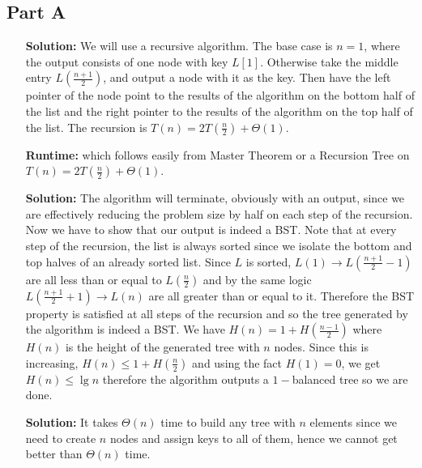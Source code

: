 \documentclass[12pt,twoside]{article}
\begin{document}
\begin{problems}
\section*{Part A}
\problem
\begin{problemparts}
\problempart
\setdefaultleftmargin{8cm}{2cm}{}{}{}{}
\begin{itemize}
\item [\textbf{Solution:} ]We will use a recursive algorithm. The base case is $n=1$, where the output consists of one node with key $L[1]$. Otherwise take the middle entry $L(\frac{n+1}{2})$, and output a node with it as the key. Then have the left pointer of the node point to the results of the algorithm on the bottom half of the list and the right pointer to the results of the algorithm on the top half of the list. The recursion is $T(n)=2T(\frac{n}{2})+\Theta(1)$.
\item [\textbf{Runtime:} ]  which follows easily from Master Theorem or a Recursion Tree on $T(n)=2T(\frac{n}{2})+\Theta(1)$.
\end{itemize}
\problempart 
\begin{itemize}
\item [\textbf{Solution:}] The algorithm will terminate, obviously with an output, since we are effectively reducing the problem size by half on each step of the recursion. Now we have to show that our output is indeed a BST. Note that at every step of the recursion, the list is always sorted since we isolate the bottom and top halves of an already sorted list. Since $L$ is sorted, $L(1) \rightarrow L(\frac{n+1}{2}-1)$ are all less than or equal to $L(\frac{n}{2})$ and by the same logic $L(\frac{n+1}{2}+1)\rightarrow L(n)$ are all greater than or equal to it. Therefore the BST property is satisfied at all steps of the recursion and so the tree generated by the algorithm is indeed a BST. We have $H(n)=1+H(\frac{n-1}{2})$ where $H(n)$ is the height of the generated tree with $n$ nodes. Since this is increasing, $H(n)\leq 1 + H(\frac{n}{2})$ and using the fact $H(1)=0$, we get $H(n) \leq \lg n$ therefore the algorithm outputs a $1-$balanced tree so we are done.
\end{itemize}
\problempart 
\begin{itemize}
\item [\textbf{Solution:}] It takes $\Theta(n)$ time to build any tree with $n$ elements since we need to create $n$ nodes and assign keys to all of them, hence we cannot get better than $\Theta(n)$ time.

\end{itemize}
\end{problemparts}
\end{problems}
\end{document}
